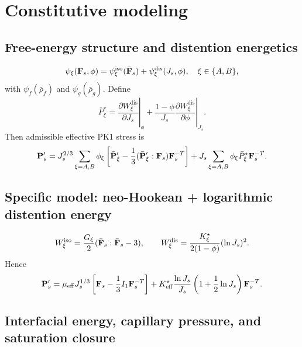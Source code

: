 \documentclass[11pt]{article}
\begin{document}
\section{Constitutive modeling}
\label{sec:constitutive}

\subsection{Free-energy structure and distention energetics}
\begin{equation}
\psi_\xi(\mathbf{F}_s,\phi)=\psi_\xi^{\mathrm{iso}}(\bar{\mathbf{F}}_s)+\psi_\xi^{\mathrm{dis}}(J_s,\phi),\quad \xi\in\{A,B\},
\label{eq:psi_decomp}
\end{equation}
with $\psi_f(\bar\rho_f)$ and $\psi_g(\bar\rho_g)$.
Define
\begin{equation}
\bar P_\xi^\star=\left.\frac{\partial W_\xi^{\mathrm{dis}}}{\partial J_s}\right|_\phi+\frac{1-\phi}{J_s}\left.\frac{\partial W_\xi^{\mathrm{dis}}}{\partial\phi}\right|_{J_s}.
\end{equation}
Then admissible effective PK1 stress is
\begin{equation}
\mathbf{P}_s'=J_s^{2/3}\sum_{\xi=A,B}\phi_\xi\left[\bar{\mathbf{P}}_\xi'-\frac13(\bar{\mathbf{P}}_\xi':\mathbf{F}_s)\mathbf{F}_s^{-T}\right]+J_s\sum_{\xi=A,B}\phi_\xi\bar P_\xi^\star\mathbf{F}_s^{-T}.
\label{eq:PK1_total}
\end{equation}

\subsection{Specific model: neo-Hookean + logarithmic distention energy}
\begin{equation}
W_\xi^{\mathrm{iso}}=\frac{G_\xi}{2}(\bar{\mathbf{F}}_s:\bar{\mathbf{F}}_s-3),
\qquad
W_\xi^{\mathrm{dis}}=\frac{K_\xi^\star}{2(1-\phi)}(\ln J_s)^2.
\end{equation}
Hence
\begin{equation}
\mathbf{P}_s' = \mu_{\mathrm{eff}}J_s^{1/3}\left[\mathbf{F}_s-\frac13I_1\mathbf{F}_s^{-T}\right] + K_{\mathrm{eff}}^\star\frac{\ln J_s}{J_s}\left(1+\frac12\ln J_s\right)\mathbf{F}_s^{-T}.
\label{eq:PK1_specific}
\end{equation}

\subsection{Interfacial energy, capillary pressure, and saturation closure}
\end{document}
